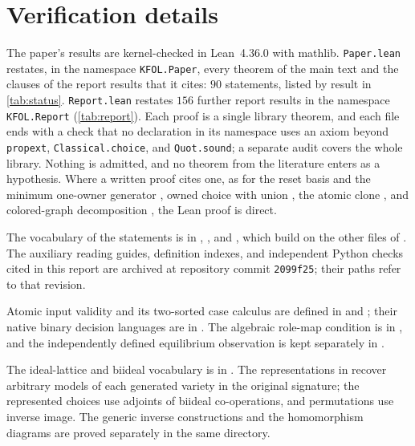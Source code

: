 \section{Verification details}\label{app:verification}

The paper's results are kernel-checked in Lean~4.36.0 with mathlib. \texttt{Paper.lean} restates, in the namespace \texttt{KFOL.Paper}, every theorem of the main text and the clauses of the report results that it cites: $90$ statements, listed by result in \cref{tab:status}. \texttt{Report.lean} restates $156$ further report results in the namespace \texttt{KFOL.Report} (\cref{tab:report}). Each proof is a single library theorem, and each file ends with a check that no declaration in its namespace uses an axiom beyond \texttt{propext}, \texttt{Classical.choice}, and \texttt{Quot.sound}; a separate audit covers the whole library. Nothing is admitted, and no theorem from the literature enters as a hypothesis. Where a written proof cites one, as for the reset basis and the minimum one-owner generator \cite{FreeseEtAl2002}, owned choice with union \cite{HardingRomanowska2017}, the atomic clone \cite{Szendrei2012}, and colored-graph decomposition \cite{Gurvich2009}, the Lean proof is direct.

The vocabulary of the statements is in , , and , which build on the other files of . The auxiliary reading guides, definition indexes, and independent Python checks cited in this report are archived at repository commit \texttt{2099f25}; their paths refer to that revision.

Atomic input validity and its two-sorted case calculus are defined in  and ; their native binary decision languages are in . The algebraic role-map condition is in , and the independently defined equilibrium observation is kept separately in .

The ideal-lattice and biideal vocabulary is in .
The representations in  recover
arbitrary models of each generated variety in the original signature; the
represented choices use adjoints of biideal co-operations, and permutations
use inverse image. The generic inverse constructions and the homomorphism
diagrams are proved separately in the same directory.

